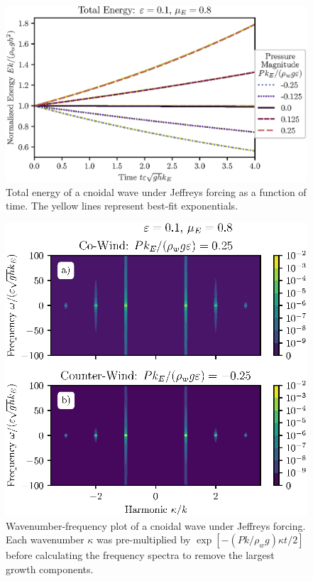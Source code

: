 \documentclass{jfm}
\begin{document}
\begin{figure}
  \centering
  \includegraphics{Total-Energy-Jeffreys.eps}
  \caption{
    Total energy of a cnoidal wave under Jeffreys forcing as a function
    of time. The yellow lines represent best-fit exponentials.
  }
\end{figure}

\begin{figure}
  \centering
  \includegraphics{Double-Power-Spectrum-Jeffreys.eps}
  \caption{
    Wavenumber-frequency plot of a cnoidal wave under Jeffreys forcing.
    Each wavenumber $\kappa$ was pre-multiplied by $\exp[-(P k/\rho_w
    g) \kappa t/2]$ before calculating the frequency spectra to remove
    the largest growth components.
  }
\end{figure}
\end{document}
